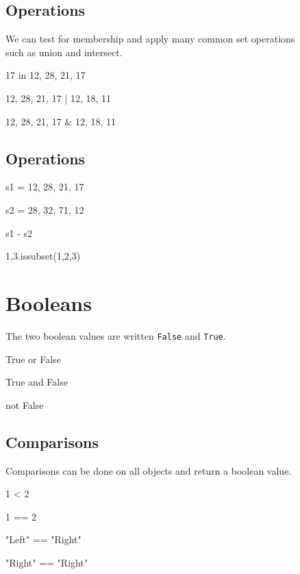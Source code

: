 \documentclass[aspectratio=1610,slidestop]{beamer}
\begin{document}
\subsection{Operations}
\begin{pframe}
We can test for membership and apply many common set operations\\
such as union and intersect.
\medskip

\begin{pyconsole}
17 in {12, 28, 21, 17}

{12, 28, 21, 17} | {12, 18, 11}

{12, 28, 21, 17} & {12, 18, 11}
\end{pyconsole}
\end{pframe}


\subsection{Operations}
\begin{pframe}
 \medskip

\begin{pyconsole}
s1 = {12, 28, 21, 17}

s2 = {28, 32, 71, 12}

s1 - s2

{1,3}.issubset({1,2,3})
\end{pyconsole}
\end{pframe}


\section{Booleans}
\makeTableOfContentsSection

\begin{pframe}
The two boolean values are written \texttt{False} and
\texttt{True}.
\begin{pyconsole}
True or False

True and False

not False
\end{pyconsole}
\end{pframe}


\subsection{Comparisons}
\begin{pframe}
  Comparisons can be done on all objects and return a boolean value.
\begin{pyconsole}
1 < 2

1 == 2

"Left" == "Right"

"Right" == "Right"
\end{pyconsole}
\end{pframe}
\end{document}
